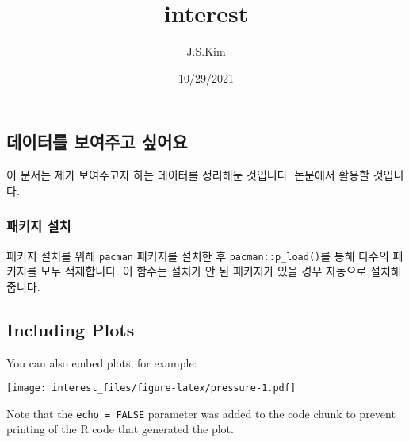 \documentclass[
]{article}
\title{interest}
\author{J.S.Kim}
\date{10/29/2021}
\begin{document}
\maketitle

\hypertarget{uxb370uxc774uxd130uxb97c-uxbcf4uxc5ecuxc8fcuxace0-uxc2f6uxc5b4uxc694}{%
\subsection{데이터를 보여주고
싶어요}\label{uxb370uxc774uxd130uxb97c-uxbcf4uxc5ecuxc8fcuxace0-uxc2f6uxc5b4uxc694}}

이 문서는 제가 보여주고자 하는 데이터를 정리해둔 것입니다. 논문에서
활용할 것입니다.

\hypertarget{uxd328uxd0a4uxc9c0-uxc124uxce58}{%
\subsubsection{패키지 설치}\label{uxd328uxd0a4uxc9c0-uxc124uxce58}}

패키지 설치를 위해 \texttt{pacman} 패키지를 설치한 후
\texttt{pacman::p\_load()}를 통해 다수의 패키지를 모두 적재합니다. 이
함수는 설치가 안 된 패키지가 있을 경우 자동으로 설치해줍니다.

\hypertarget{including-plots}{%
\subsection{Including Plots}\label{including-plots}}

You can also embed plots, for example:

\texttt{[image: interest\_files/figure-latex/pressure-1.pdf]}

Note that the \texttt{echo\ =\ FALSE} parameter was added to the code
chunk to prevent printing of the R code that generated the plot.
\end{document}
